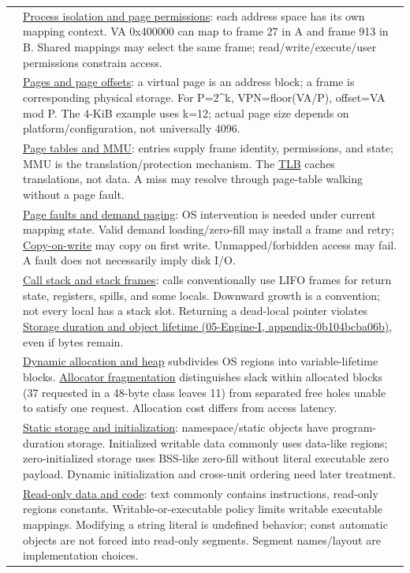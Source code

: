 {\begin{longtable}[]{@{}
  >{\raggedright\arraybackslash}p{}
  >{\raggedright\arraybackslash}p{}@{}}
53 & \hyperref[appendix-c2a9ad1e2b49]{Process isolation and page permissions}: each address space has its own mapping context. VA 0x400000 can map to frame 27 in A and frame 913 in B. Shared mappings may select the same frame; read/write/execute/user permissions constrain access. \\
54 & \hyperref[appendix-0c67cd5bf30a]{Pages and page offsets}: a virtual page is an address block; a frame is corresponding physical storage. For P=2\^{}k, VPN=floor(VA/P), offset=VA mod P. The 4-KiB example uses k=12; actual page size depends on platform/configuration, not universally 4096. \\
55 & \hyperref[appendix-01e5905165c4]{Page tables and MMU}: entries supply frame identity, permissions, and state; MMU is the translation/protection mechanism. The \hyperref[appendix-7a2d9c5ce511]{TLB} caches translations, not data. A miss may resolve through page-table walking without a page fault. \\
56 & \hyperref[appendix-cc0909a7ef14]{Page faults and demand paging}: OS intervention is needed under current mapping state. Valid demand loading/zero-fill may install a frame and retry; \hyperref[appendix-7a06e5baac04]{Copy-on-write} may copy on first write. Unmapped/forbidden access may fail. A fault does not necessarily imply disk I/O. \\
57 & \hyperref[appendix-b081b7abe193]{Call stack and stack frames}: calls conventionally use LIFO frames for return state, registers, spills, and some locals. Downward growth is a convention; not every local has a stack slot. Returning a dead-local pointer violates \href{}{Storage duration and object lifetime (05-Engine-I, appendix-0b104bcba06b)}, even if bytes remain. \\
58 & \hyperref[appendix-c3480f7d9ff3]{Dynamic allocation and heap} subdivides OS regions into variable-lifetime blocks. \hyperref[appendix-a7c50686d81f]{Allocator fragmentation} distinguishes slack within allocated blocks (37 requested in a 48-byte class leaves 11) from separated free holes unable to satisfy one request. Allocation cost differs from access latency. \\
59 & \hyperref[appendix-17c93c4c2f19]{Static storage and initialization}: namespace/static objects have program-duration storage. Initialized writable data commonly uses data-like regions; zero-initialized storage uses BSS-like zero-fill without literal executable zero payload. Dynamic initialization and cross-unit ordering need later treatment. \\
60 & \hyperref[appendix-5f9e5e2f0a5e]{Read-only data and code}: text commonly contains instructions, read-only regions constants. Writable-or-executable policy limits writable executable mappings. Modifying a string literal is undefined behavior; const automatic objects are not forced into read-only segments. Segment names/layout are implementation choices. \\
\end{longtable}
}

